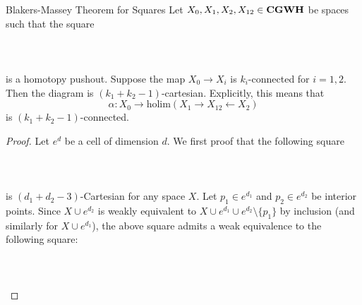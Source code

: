 \documentclass[a4paper]{article}
\begin{document}
\begin{thm}{Blakers-Massey Theorem for Squares}{} Let $X_0,X_1,X_2,X_{12}\in\bold{CGWH}$ be spaces such that the square \\~\\
\\~\\
is a homotopy pushout. Suppose the map $X_0\to X_i$ is $k_i$-connected for $i=1,2$. Then the diagram is $(k_1+k_2-1)$-cartesian. Explicitly, this means that $$\alpha:X_0\to\text{holim}(X_1\rightarrow X_{12}\leftarrow X_2)$$ is $(k_1+k_2-1)$-connected. \tcbline
\begin{proof}




Let $e^d$ be a cell of dimension $d$. We first proof that the following square \\~\\
\\~\\
is $(d_1+d_2-3)$-Cartesian for any space $X$. Let $p_1\in e^{d_1}$ and $p_2\in e^{d_2}$ be interior points. Since $X\cup e^{d_2}$ is weakly equivalent to $X\cup e^{d_1}\cup e^{d_2}\setminus\{p_1\}$ by inclusion (and similarly for $X\cup e^{d_1}$), the above square admits a weak equivalence to the following square: \\~\\
\\~\\
\end{proof}
\end{thm}
\end{document}
